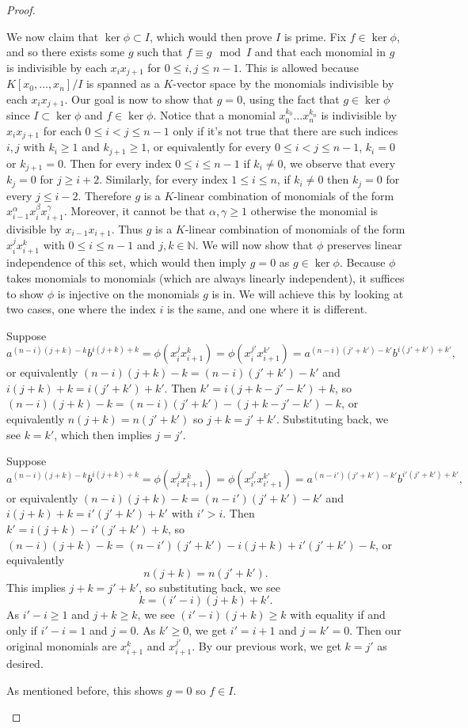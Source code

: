 \documentclass{article}
\newcommand{\N}{\mathbb{N}}
\begin{document}
\begin{proof}
\begin{enumerate}[(a)]
        We now claim that $\ker \phi \subset I$, which would then prove $I$ is prime. Fix $f\in \ker \phi$, and so there exists some $g$ such that $f\equiv g \mod I$ and that each monomial in $g$ is indivisible by each $x_ix_{j+1}$ for $0\le i,j\le n-1$. This is allowed because $K[x_0,\dots, x_n]/I$ is spanned as a $K$-vector space by the monomials indivisible by each $x_ix_{j+1}$. Our goal is now to show that $g=0$, using the fact that $g\in \ker \phi$ since $I\subset \ker \phi$ and $f\in \ker \phi$. Notice that a monomial $x_0^{k_0} \dots x_n ^{k_n}$ is indivisible by $x_i x_{j+1}$ for each $0\le i < j \le n-1$ only if it's not true that there are such indices $i,j$ with $k_i \ge 1$ and $k_{j+1}\ge 1$, or equivalently for every $0\le i<j\le n-1$, $k_i = 0$ or $k_{j+1}=0$. Then for every index $0\le i \le n-1$ if $k_i\ne 0$, we observe that every $k_j=0$ for $j\ge i+2$. Similarly, for every index $1\le i \le n$, if $k_i \ne 0$ then $k_j = 0$ for every $j\le i-2$. Therefore $g$ is a $K$-linear combination of monomials of the form $x_{i-1}^ \alpha x_i ^\beta x_{i+1}^\gamma$. Moreover, it cannot be that $\alpha, \gamma \ge 1$ otherwise the monomial is divisible by $x_{i-1} x_{i+1}$. Thus $g$ is a $K$-linear combination of monomials of the form $x_i^j x_{i+1}^k$ with $0\le i \le n-1$ and $j,k \in \N$. We will now show that $\phi$ preserves linear independence of this set, which would then imply $g=0$ as $g\in \ker \phi$. Because $\phi$ takes monomials to monomials (which are always linearly independent), it suffices to show $\phi$ is injective on the monomials $g$ is in. We will achieve this by looking at two cases, one where the index $i$ is the same, and one where it is different.

        \vspace{0.1in}
        Suppose \[
        a^{(n-i)(j+k)-k}b^{i(j+k)+k}=\phi(x_i^j x_{i+1}^k)= \phi(x_i^{j'} x_{i+1}^{k'}) = a^{(n-i)(j'+k')-k'}b^{i(j'+k')+k'},
        \]
        or equivalently $(n-i)(j+k)-k = (n-i)(j'+k')-k'$ and $i(j+k)+k = i(j'+k')+k'$. Then $k'=i(j+k-j'-k')+k$, so $(n-i)(j+k)-k=(n-i)(j'+k')-(j+k-j'-k')-k$, or equivalently $n(j+k)=n(j'+k')$ so $j+k=j'+k'$. Substituting back, we see $k=k'$, which then implies $j=j'$.

        \vspace{0.1in}
        Suppose \[
        a^{(n-i)(j+k)-k}b^{i(j+k)+k}=\phi(x_i^j x_{i+1}^k)= \phi(x_{i'}^{j'} x_{i'+1}^{k'}) = a^{(n-i')(j'+k')-k'}b^{i'(j'+k')+k'},
        \]
        or equivalently $(n-i)(j+k)-k = (n-i')(j'+k')-k'$ and $i(j+k)+k = i'(j'+k')+k'$ with $i'>i$. Then $k'=i(j+k)-i'(j'+k')+k$, so $(n-i)(j+k)-k=(n-i')(j'+k')-i(j+k)+i'(j'+k')-k$, or equivalently $$n(j+k)=n(j'+k').$$ This implies $j+k=j'+k'$, so substituting back, we see $$k=(i'-i)(j+k)+k'.$$ As $i'-i\ge 1$ and $j+k\ge k$, we see $(i'-i)(j+k)\ge k$ with equality if and only if $i'-i=1$ and $j=0$. As $k'\ge 0$, we get $i'=i+1$ and $j=k'=0$. Then our original monomials are $x_{i+1}^k$ and $x_{i+1}^{j'}$. By our previous work, we get $k=j'$ as desired.

        \vspace{0.1in}
        As mentioned before, this shows $g=0$ so $f\in I$.
    \end{enumerate}
\end{proof}
\end{document}

